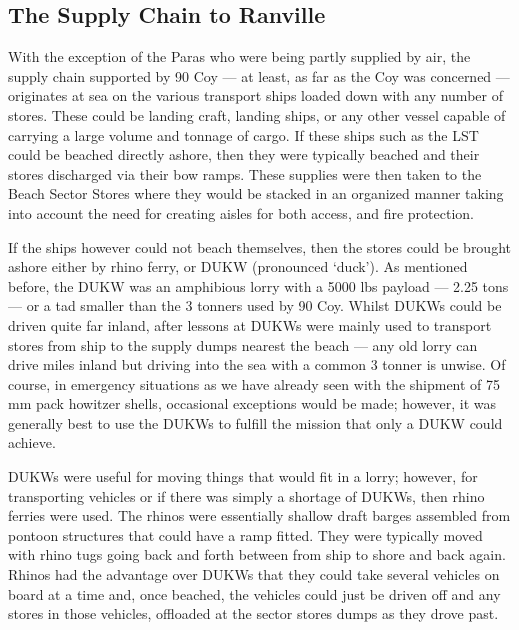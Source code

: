 \documentclass[noraggedright]{turabian-researchpaper}
\begin{document}
\subsection{The Supply Chain to Ranville}

With the exception of the Paras who were being partly supplied by air, the
supply chain supported by 90 Coy --- at least, as far as the Coy was concerned
--- originates at sea on the various transport ships loaded down with any 
number of stores.  These could be landing craft, landing ships, or any other
vessel capable of carrying a large volume and tonnage of cargo.  If these
ships such as the LST could be beached directly ashore, then they were 
typically beached and their stores discharged via their bow ramps.  These 
supplies were then taken to the Beach Sector Stores where they would be 
stacked in an organized manner taking into account the need for creating
aisles for both access, and fire protection.  

If the ships however could not beach themselves, then the stores could be
brought ashore either by rhino ferry, or DUKW (pronounced `duck').  As 
mentioned before, the DUKW was an amphibious lorry with a 5000 lbs 
payload --- 2.25 tons --- or a tad smaller than the 3 tonners used by 90 Coy.
Whilst DUKWs could be driven quite far inland, after lessons at %
DUKWs were mainly used to transport stores from ship to the supply
dumps nearest the beach --- any old lorry can drive miles inland but driving
into the sea with a common 3 tonner is unwise.  Of course, in emergency 
situations as we have already seen with the shipment of 75 mm pack howitzer
shells, occasional exceptions would be made; however, it was generally best
to use the DUKWs to fulfill the mission that only a DUKW could achieve.

DUKWs were useful for moving things that would fit in a lorry; however, for
transporting vehicles or if there was simply a shortage of DUKWs, then rhino
ferries were used.  The rhinos were essentially shallow draft barges assembled
from pontoon structures that could have a ramp fitted.  They were typically 
moved with rhino tugs going back and forth between from ship to shore and back
again.  Rhinos had the advantage over DUKWs that they could take several 
vehicles on board at a time and, once beached, the vehicles could just be
driven off and any stores in those vehicles, offloaded at the sector stores
dumps as they drove past.  
\end{document}
